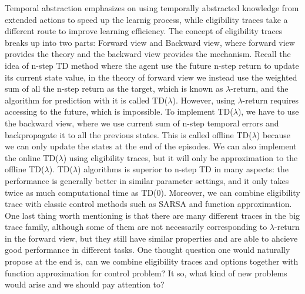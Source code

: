 \documentclass[12pt,a4paper]{article}
\begin{document}
Temporal abstraction emphasizes on using temporally abstracted knowledge from extended actions to speed up the learnig process, while eligibility traces take a different route to improve learning efficiency. The concept of eligibility traces breaks up into two parts: Forward view and Backward view, where forward view provides the theory and the backward view provides the mechanism. Recall the idea of n-step TD method where the agent use the future n-step return to update its current state value, in the theory of forward view we instead use the weighted sum of all the n-step return as the target, which is known as $\lambda$-return, and the algorithm for prediction with it is called TD($\lambda$). However, using $\lambda$-return requires accessing to the future, which is impossible. To implement TD($\lambda$), we have to use the backward view, where we use current sum of n-step temporal errors and backpropagate it to all the previous states. This is called offline TD($\lambda$) because we can only update the states at the end of the episodes. We can also implement the online TD($\lambda$) using eligibility traces, but it will only be approximation to the offline TD($\lambda$). TD($\lambda$) algorithms is superior to n-step TD in many aspects: the performance is generally better in similar parameter settings, and it only takes twice as much computational time as TD(0). Moreover, we can combine eligibility trace with classic control methods such as SARSA and function approximation.\\

One last thing worth mentioning is that there are many different traces in the big trace family, although some of them are not necessarily corresponding to $\lambda$-return in the forward view, but they still have similar properties and are able to ahcieve good performance in different tasks. One thought question one would naturally propose at the end is, can we combine eligibility traces and options together with function approximation for control problem? It so, what kind of new problems would arise and we should pay attention to?  
\end{document}
